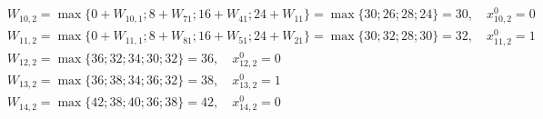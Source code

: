 \begin{align*}
     & W_{10, 2} = \max \{0 + W_{10, 1}; 8 + W_{71}; 16 + W_{41}; 24 + W_{11}\} = \max \{30; 26; 28; 24\} = 30, \quad x_{10, 2}^0 = 0                                                  \\
     & W_{11, 2} = \max \{0 + W_{11, 1}; 8 + W_{81}; 16 + W_{51}; 24 + W_{21}\} = \max \{30; 32; 28; 30\} = 32, \quad x_{11, 2}^0 = 1                                                  \\
     & W_{12, 2} = \max \{36; 32; 34; 30; 32\} = 36, \quad x_{12, 2}^0 = 0                                                                                                             \\
     & W_{13, 2} = \max \{36; 38; 34; 36; 32\} = 38, \quad x_{13, 2}^0 = 1                                                                                                             \\
     & W_{14, 2} = \max \{42; 38; 40; 36; 38\} = 42, \quad x_{14, 2}^0 = 0
\end{align*}


